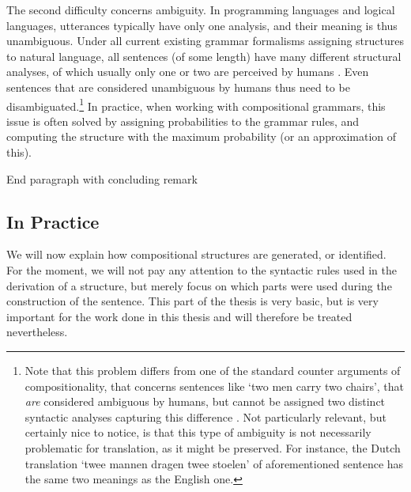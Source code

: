 \documentclass{report}
\theoremstyle{break}
\begin{document}
The second difficulty concerns ambiguity. In programming languages and logical languages, utterances typically have only one analysis, and their meaning is thus unambiguous. Under all current existing grammar formalisms assigning structures to natural language, all sentences (of some length) have many different structural analyses, of which usually only one or two are perceived by humans \citep{scha1990taaltheorie}. Even sentences that are considered unambiguous by humans thus need to be disambiguated.\footnote{Note that this problem differs from one of the standard counter arguments of compositionality, that concerns sentences like `two men carry two chairs', that \textit{are} considered ambiguous by humans, but cannot be assigned two distinct syntactic analyses capturing this difference \citep{pelletier1994principle}. Not particularly relevant, but certainly nice to notice, is that this type of ambiguity is not necessarily problematic for translation, as it might be preserved. For instance, the Dutch translation `twee mannen dragen twee stoelen' of aforementioned sentence has the same two meanings as the English one.} In practice, when working with compositional grammars, this issue is often solved by assigning probabilities to the grammar rules, and computing the structure with the maximum probability (or an approximation of this).

End paragraph with concluding remark


\subsection{In Practice}

We will now explain how compositional structures are generated, or identified. For the moment, we will not pay any attention to the syntactic rules used in the derivation of a structure, but merely focus on which parts were used during the construction of the sentence. This part of the thesis is very basic, but is very important for the work done in this thesis and will therefore be treated nevertheless.
\end{document}
